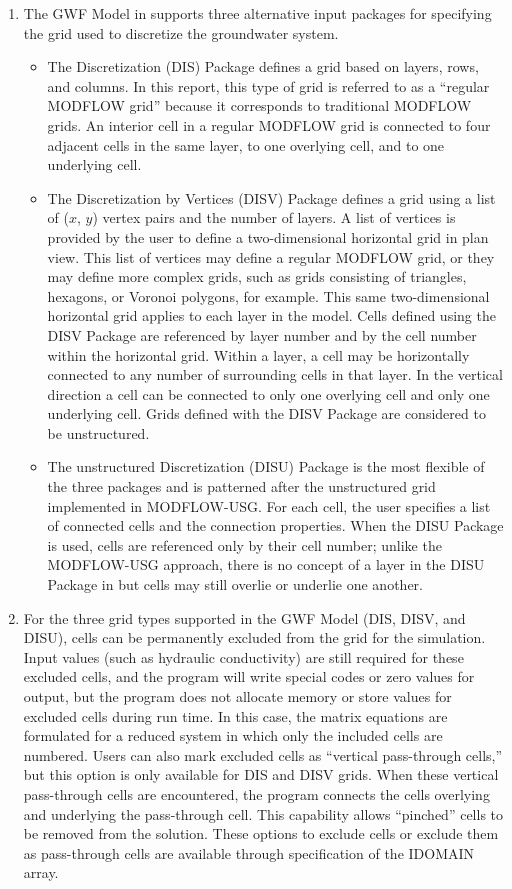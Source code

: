 \begin{enumerate}

\item The GWF Model in \mf supports three alternative input packages for specifying the grid used to discretize the groundwater system.  
\begin{itemize}
\item The Discretization (DIS) Package defines a grid based on layers, rows, and columns.  In this report, this type of grid is referred to as a ``regular MODFLOW grid'' because it corresponds to traditional MODFLOW grids.  An interior cell in a regular MODFLOW grid is connected to four adjacent cells in the same layer, to one overlying cell, and to one underlying cell.
\item The Discretization by Vertices (DISV) Package defines a grid using a list of ($x$, $y$) vertex pairs and the number of layers.  A list of vertices is provided by the user to define a two-dimensional horizontal grid in plan view.  This list of vertices may define a regular MODFLOW grid, or they may define more complex grids, such as grids consisting of triangles, hexagons, or Voronoi polygons, for example.  This same two-dimensional horizontal grid applies to each layer in the model.  Cells defined using the DISV Package are referenced by layer number and by the cell number within the horizontal grid.  Within a layer, a cell may be horizontally connected to any number of surrounding cells in that layer.  In the vertical direction a cell can be connected to only one overlying cell and only one underlying cell.  Grids defined with the DISV Package are considered to be unstructured.
\item The unstructured Discretization (DISU) Package is the most flexible of the three packages and is patterned after the unstructured grid implemented in MODFLOW-USG.  For each cell, the user specifies a list of connected cells and the connection properties.  When the DISU Package is used, cells are referenced only by their cell number; unlike the MODFLOW-USG approach, there is no concept of a layer in the DISU Package in \mfcomma but cells may still overlie or underlie one another.  
\end{itemize}

\item For the three grid types supported in the GWF Model (DIS, DISV, and DISU), cells can be permanently excluded from the grid for the simulation.  Input values (such as hydraulic conductivity) are still required for these excluded cells, and the program will write special codes or zero values for output, but the program does not allocate memory or store values for excluded cells during run time.  In this case, the matrix equations are formulated for a reduced system in which only the included cells are numbered.  Users can also mark excluded cells as ``vertical pass-through cells,'' but this option is only available for DIS and DISV grids.  When these vertical pass-through cells are encountered, the program connects the cells overlying and underlying the pass-through cell.  This capability allows ``pinched'' cells to be removed from the solution.  These options to exclude cells or exclude them as pass-through cells are available through specification of the IDOMAIN array.


\end{enumerate}
